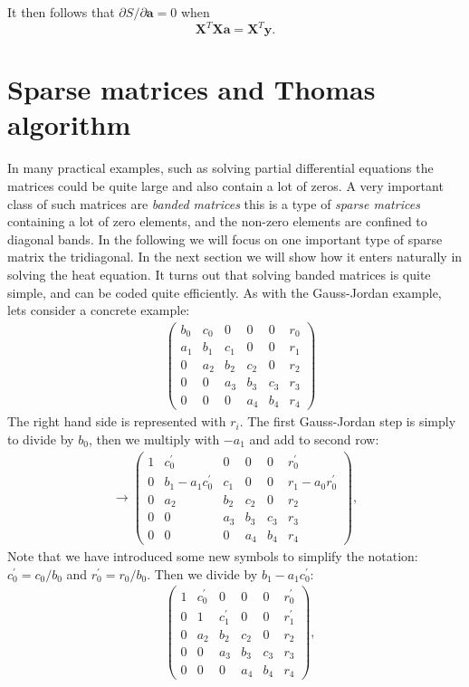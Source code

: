 \documentclass[graybox,sectrefs,envcountresetchap,open=right,final]{svmonodo}
\begin{document}
It then follows that $\partial S/\partial \mathbf{a} = 0$ when
\begin{equation}
\mathbf{X}^T\mathbf{X a}=\mathbf{X}^T\mathbf{y}.
\label{eq:lin:matpr}
\end{equation}

\section{Sparse matrices and Thomas algorithm}
In many practical examples, such as solving partial differential
equations the matrices could be quite large and also contain a lot of
zeros. A very important class of such matrices are \emph{banded matrices}
this is a type of \emph{sparse matrices} containing a lot of zero elements,
and the non-zero elements are confined to diagonal bands. In the
following we will focus on one important type of sparse matrix the
tridiagonal. In the next section we will show how it enters naturally
in solving the heat equation. It turns out that solving banded
matrices is quite simple, and can be coded quite efficiently. As with
the Gauss-Jordan example, lets consider a concrete example:
\begin{align}
&\left(
\begin{array}{ccccc|c}
b_0&c_0&0&0&0&r_0\\ 
a_1&b_1&c_1&0&0&r_1\\ 
0&a_2&b_2&c_2&0&r_2\\ 
0& 0&a_3&b_3&c_3&r_3\\ 
0& 0& 0&a_4&b_4&r_4
\end{array}
\right)
\end{align}
The right hand side is represented with $r_i$. The first Gauss-Jordan
step is simply to divide by $b_0$, then we multiply with $-a_1$ and
add to second row:
\begin{align}
\to \left(
\begin{array}{ccccc|c}
1&c_0^\prime&0&0&0&r_0^\prime\\ 
0&b_1-a_1c_0^\prime&c_1&0&0&r_1-a_0r_0^\prime\\ 
0&a_2&b_2&c_2&0&r_2\\ 
0& 0&a_3&b_3&c_3&r_3\\ 
0& 0& 0&a_4&b_4&r_4
\end{array}
\right),
\end{align}
Note that we have introduced some new symbols to simplify the
notation: $c_0^\prime=c_0/b_0$ and $r_0^\prime=r_0/b_0$. Then we
divide by $b_1-a_1c_0^\prime$:
\begin{align}
&\left(
\begin{array}{ccccc|c}
1&c_0^\prime&0&0&0&r_0^\prime\\ 
0&1&c_1^\prime&0&0&r_1^\prime\\ 
0&a_2&b_2&c_2&0&r_2\\ 
0& 0&a_3&b_3&c_3&r_3\\ 
0& 0& 0&a_4&b_4&r_4
\end{array}
\right),
\end{align}
\end{document}
